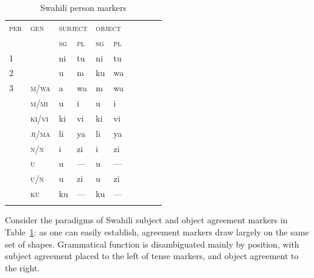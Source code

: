 \documentclass[output=paper
	        ,collection
	        ,collectionchapter
 	        ,biblatex
                ,babelshorthands
                ,newtxmath
                ,draftmode
                ,colorlinks, citecolor=brown
]{langscibook}
\begin{document}
\begin{exe}
\begin{xlist}
\begin{exe}
\begin{xlist}
\begin{table}[hbt]
  \centering
  \small
  \begin{tabular}{llllllllll}
    \lsptoprule
    \textsc{per} & \textsc{gen} & \multicolumn{2}{l}{\textsc{subject}} &
                                                                         \multicolumn{2}{l}{\textsc{object}}\\%
                 & & \textsc{sg} & \textsc{pl} & \textsc{sg} & \textsc{pl}\\%
    \midrule
    1	&       & ni & tu  & ni & tu\\%
    2	&       & u	 & m   & ku & wa\\%
    3	& \textsc{m/wa}  & a	 & wa  & m  & wa\\%
                 & \textsc{m/mi}	& u  & i   & u  & i \\%
                 & \textsc{ki/vi}	& ki & vi  & ki & vi \\%
                 & \textsc{ji/ma} & li & ya  & li & ya \\%
                 & \textsc{n/n} & i    & zi  & i  & zi \\%
                 & \textsc{u}     & u  & --- & u  & --- \\%
                 & \textsc{u/n}   & u  & zi  & u  & zi  \\%
                 & \textsc{ku}    & ku & --- & ku & --- \\%
    \lspbottomrule
\end{tabular}
  \caption{Swahili person markers \citep{Stump93}} \label{ex:SwaPer} 

\end{table}

Consider the paradigms of Swahili subject and object agreement markers
in Table~\ref{ex:SwaPer}: as one can easily establish, agreement
markers draw largely on the same set of shapes. Grammatical function
is disambiguated mainly by position, with subject agreement placed 
to the left of tense markers, and object agreement to the right. 


\end{xlist}
\end{exe}
\end{xlist}
\end{exe}
\end{document}
